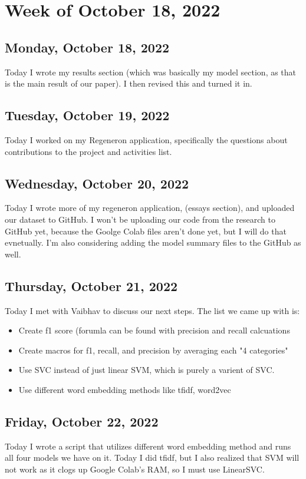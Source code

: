 \documentclass[11pt,letterpaper]{article}
\begin{document}
\section{Week of October 18, 2022}
\subsection{Monday, October 18, 2022}
Today I wrote my results section (which was basically my model section, as that is the main result of our paper). I then revised this and turned it in.

\subsection{Tuesday, October 19, 2022}
Today I worked on my Regeneron application, specifically the questions about contributions to the project and activities list.

\subsection{Wednesday, October 20, 2022}
Today I wrote more of my regeneron application, (essays section), and uploaded our dataset to GitHub. I won't be uploading our code from the research to GitHub yet, because the Goolge Colab files aren't done yet, but I will do that evnetually. I'm also considering adding the model summary files to the GitHub as well.

\subsection{Thursday, October 21, 2022}
Today I met with Vaibhav to discuss our next steps. The list we came up with is:
\begin{itemize}
    \item Create f1 score (forumla can be found with precision and recall calcuations
    \item Create macros for f1, recall, and precision by averaging each "4 categories"
    \item Use SVC instead of just linear SVM, which is purely a varient of SVC.
    \item Use different word embedding methods like tfidf, word2vec
\end{itemize}


\subsection{Friday, October 22, 2022}
Today I wrote a script that utilizes different word embedding method and runs all four models we have on it. Today I did tfidf, but I also realized that SVM will not work as it clogs up Google Colab's RAM, so I must use LinearSVC. 
\end{document}
